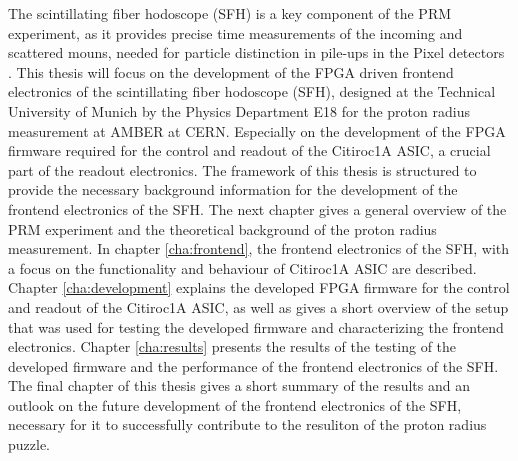 \newline
The scintillating fiber hodoscope (SFH) is a key component of the PRM experiment, as it provides precise time measurements of the incoming and scattered mouns,
needed for particle distinction in pile-ups in the Pixel detectors .\Autocite{InternalcommunicationIgor}%
\newline
This thesis will focus on the development of the FPGA driven frontend electronics of the scintillating fiber hodoscope (SFH),
designed at the Technical University of Munich by the Physics Department E18 for the proton radius measurement at AMBER at CERN.
Especially on the development of the FPGA firmware required for the control and readout of the Citiroc1A ASIC,
a crucial part of the readout electronics.
\newline 
The framework of this thesis is structured to provide the necessary background information for the development of the frontend electronics of the SFH.
\newline
The next chapter gives a general overview of the PRM experiment and the theoretical background of the proton radius measurement.
\newline 
In chapter \ref{cha:frontend}, the frontend electronics of the SFH, with a focus on the functionality and behaviour of Citiroc1A ASIC are described.
\newline
Chapter \ref{cha:development} explains the developed FPGA firmware for the control and readout of the Citiroc1A ASIC, as well as gives a short overview of the setup that was used for testing the developed firmware and characterizing the frontend electronics.
\newline
Chapter \ref{cha:results} presents the results of the testing of the developed firmware and the performance of the frontend electronics of the SFH.
\newline 
The final chapter of this thesis gives a short summary of the results and an outlook on the future development of the frontend electronics of the SFH,
necessary for it to successfully contribute to the resuliton of the proton radius puzzle.



 
